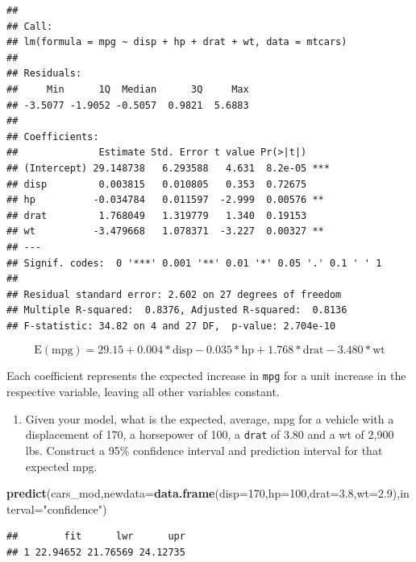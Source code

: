 \documentclass[
]{book}
\newenvironment{Shaded}{\begin{snugshade}}{\end{snugshade}}
\newcommand{\DataTypeTok}[1]{\textcolor[rgb]{0.13,0.29,0.53}{#1}}
\newcommand{\DecValTok}[1]{\textcolor[rgb]{0.00,0.00,0.81}{#1}}
\newcommand{\FloatTok}[1]{\textcolor[rgb]{0.00,0.00,0.81}{#1}}
\newcommand{\KeywordTok}[1]{\textcolor[rgb]{0.13,0.29,0.53}{\textbf{#1}}}
\newcommand{\NormalTok}[1]{#1}
\newcommand{\StringTok}[1]{\textcolor[rgb]{0.31,0.60,0.02}{#1}}
\providecommand{\tightlist}{%
  \setlength{\itemsep}{0pt}\setlength{\parskip}{0pt}}
\begin{document}
\begin{verbatim}
## 
## Call:
## lm(formula = mpg ~ disp + hp + drat + wt, data = mtcars)
## 
## Residuals:
##     Min      1Q  Median      3Q     Max 
## -3.5077 -1.9052 -0.5057  0.9821  5.6883 
## 
## Coefficients:
##              Estimate Std. Error t value Pr(>|t|)    
## (Intercept) 29.148738   6.293588   4.631  8.2e-05 ***
## disp         0.003815   0.010805   0.353  0.72675    
## hp          -0.034784   0.011597  -2.999  0.00576 ** 
## drat         1.768049   1.319779   1.340  0.19153    
## wt          -3.479668   1.078371  -3.227  0.00327 ** 
## ---
## Signif. codes:  0 '***' 0.001 '**' 0.01 '*' 0.05 '.' 0.1 ' ' 1
## 
## Residual standard error: 2.602 on 27 degrees of freedom
## Multiple R-squared:  0.8376, Adjusted R-squared:  0.8136 
## F-statistic: 34.82 on 4 and 27 DF,  p-value: 2.704e-10
\end{verbatim}

\[
\mbox{E}(\text{mpg})=29.15+0.004*\text{disp}-0.035*\text{hp}+1.768*\text{drat}-3.480*\text{wt}
\]

Each coefficient represents the expected increase in \texttt{mpg} for a unit increase in the respective variable, leaving all other variables constant.

\begin{enumerate}
\def\labelenumi{\alph{enumi}.}
\setcounter{enumi}{1}
\tightlist
\item
  Given your model, what is the expected, average, mpg for a vehicle with a displacement of 170, a horsepower of 100, a \texttt{drat} of 3.80 and a wt of 2,900 lbs. Construct a 95\% confidence interval and prediction interval for that expected mpg.
\end{enumerate}

\begin{Shaded}
\begin{Highlighting}[]
\KeywordTok{predict}\NormalTok{(cars_mod,}\DataTypeTok{newdata=}\KeywordTok{data.frame}\NormalTok{(}\DataTypeTok{disp=}\DecValTok{170}\NormalTok{,}\DataTypeTok{hp=}\DecValTok{100}\NormalTok{,}\DataTypeTok{drat=}\FloatTok{3.8}\NormalTok{,}\DataTypeTok{wt=}\FloatTok{2.9}\NormalTok{),}\DataTypeTok{interval=}\StringTok{"confidence"}\NormalTok{)}
\end{Highlighting}
\end{Shaded}

\begin{verbatim}
##        fit      lwr      upr
## 1 22.94652 21.76569 24.12735
\end{verbatim}
\end{document}
